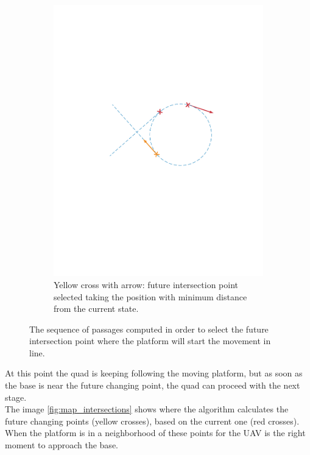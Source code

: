 \begin{itemize}
\begin{figure}[!htbp]
    \begin{subfigure}[b]{0.45\textwidth}
        \includegraphics[width=\textwidth]{img/intersection_5.pdf}
        \caption{Yellow cross with arrow: future intersection point selected taking the position with minimum distance from the current state. }
        \label{fig:five}
   \end{subfigure}
  \caption{The sequence of passages computed in order to select the future intersection point where the platform will start the movement in line.}
  \label{fig:sequence_find_next_intersection}
\end{figure} 
\end{itemize}

\newpage
At this point the quad is keeping following the moving platform, but as soon as the base is near the future changing point, the quad can proceed with the next stage.\\

The image \ref{fig:map_intersections} shows where the algorithm calculates the future changing points (yellow crosses), based on the current one (red crosses). When the platform is in a neighborhood of these points for the UAV is the right moment to approach the base.

